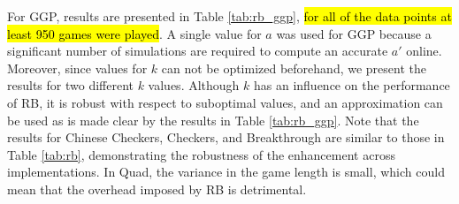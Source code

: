 \documentclass{ecai2014}
\begin{document}
For GGP, results are presented in Table \ref{tab:rb_ggp}, \hl{for all of the data points at least 950 games were played}. A single value for $a$ was used for GGP because a significant number of simulations are required to compute an accurate $a'$ online. Moreover, since values for $k$ can not be optimized beforehand, we present the results for two different $k$ values. Although $k$ has an influence on the performance of RB, it is robust with respect to suboptimal values, and an approximation can be used as is made clear by the results in Table \ref{tab:rb_ggp}. Note that the results for Chinese Checkers, Checkers, and Breakthrough are similar to those in Table \ref{tab:rb}, demonstrating the robustness of the enhancement across implementations. In Quad, the variance in the game length is small, which could mean that the overhead imposed by RB is detrimental.

\begin{table}
{\caption{Qualitative Bonus using different search times, 5000 games} \label{tab:qb}}
\tabcolsep=0.15cm
\centering
{}
\end{table}
\end{document}

